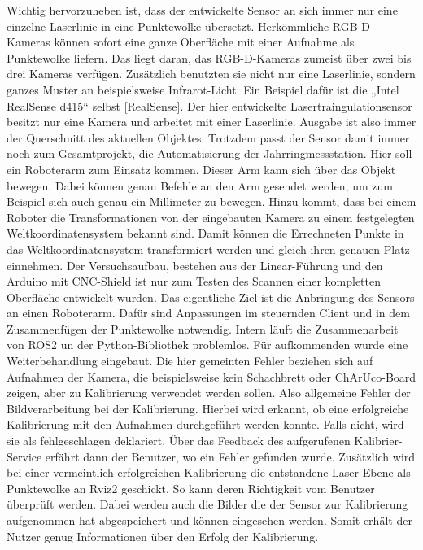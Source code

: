 	Wichtig hervorzuheben ist, dass der entwickelte Sensor an sich immer nur eine einzelne Laserlinie in eine Punktewolke übersetzt. Herkömmliche RGB-D-Kameras können sofort eine ganze Oberfläche mit einer Aufnahme als Punktewolke liefern. Das liegt daran, das RGB-D-Kameras zumeist über zwei bis drei Kameras verfügen. Zusätzlich benutzten sie nicht nur eine Laserlinie, sondern ganzes Muster an beispielsweise Infrarot-Licht. Ein Beispiel dafür ist die „Intel RealSense d415“ selbst [RealSense]. Der hier entwickelte Lasertraingulationsensor besitzt nur eine Kamera und arbeitet mit einer Laserlinie. Ausgabe ist also immer der Querschnitt des aktuellen Objektes. Trotzdem passt der Sensor damit immer noch zum Gesamtprojekt, die Automatisierung der Jahrringmessstation. Hier soll ein Roboterarm zum Einsatz kommen. Dieser Arm kann sich über das Objekt bewegen. Dabei können genau Befehle an den Arm gesendet werden, um zum Beispiel sich auch genau ein Millimeter zu bewegen. Hinzu kommt, dass bei einem Roboter die Transformationen von der eingebauten Kamera zu einem festgelegten Weltkoordinatensystem bekannt sind. Damit können die Errechneten Punkte in das Weltkoordinatensystem transformiert werden und gleich ihren genauen Platz einnehmen. Der Versuchsaufbau, bestehen aus der Linear-Führung und den Arduino mit CNC-Shield ist nur zum Testen des Scannen einer kompletten Oberfläche entwickelt wurden. Das eigentliche Ziel ist die Anbringung des Sensors an einen Roboterarm. Dafür sind Anpassungen im steuernden Client und in dem Zusammenfügen der Punktewolke notwendig. \newline
	Intern läuft die Zusammenarbeit von ROS2 un der Python-Bibliothek problemlos. Für aufkommenden wurde eine Weiterbehandlung eingebaut. Die hier gemeinten Fehler beziehen sich auf Aufnahmen der Kamera, die beispielsweise kein Schachbrett oder ChArUco-Board zeigen, aber zu Kalibrierung verwendet werden sollen. Also allgemeine Fehler der Bildverarbeitung bei der Kalibrierung. Hierbei wird erkannt, ob eine erfolgreiche Kalibrierung mit den Aufnahmen durchgeführt werden konnte. Falls nicht, wird sie als fehlgeschlagen deklariert. Über das Feedback des aufgerufenen Kalibrier-Service erfährt dann der Benutzer, wo ein Fehler gefunden wurde. Zusätzlich wird bei einer vermeintlich erfolgreichen Kalibrierung die entstandene Laser-Ebene als Punktewolke an Rviz2 geschickt. So kann deren Richtigkeit vom Benutzer überprüft werden. Dabei werden auch die Bilder die der Sensor zur Kalibrierung aufgenommen hat abgespeichert und können eingesehen werden. Somit erhält der Nutzer genug Informationen über den Erfolg der Kalibrierung. 
